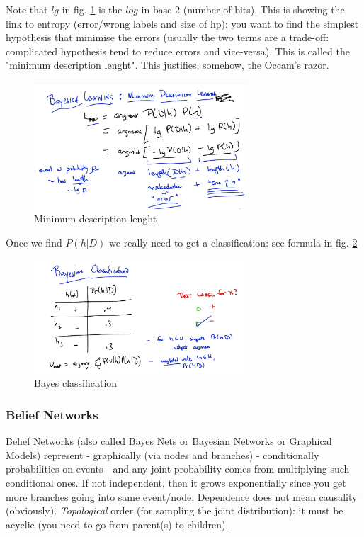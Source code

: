 \documentclass[11pt]{article}
\begin{document}
Note that $lg$ in fig. \ref{bayesian_learning3} is the $log$ in base $2$ (number of bits). This is showing the link to entropy (error/wrong labels and size of hp): you want to find the simplest hypothesis that minimise the errors (usually the two terms are a trade-off: complicated hypothesis tend to reduce errors and vice-versa). This is called the "minimum description lenght". This justifies, somehow, the Occam's razor.
\begin{figure}[htbp] 
	\centering
	\includegraphics[width=0.7\textwidth]{pics/bayesian_learning_3}
	\caption{Minimum description lenght} 
	\label{bayesian_learning3}
\end{figure}

Once we find $P(h|D)$ we really need to get a classification: see formula in fig. \ref{bayesian_learning4} 
\begin{figure}[htbp] 
	\centering
	\includegraphics[width=0.7\textwidth]{pics/bayesian_learning_4}
	\caption{Bayes classification} 
	\label{bayesian_learning4}
\end{figure}

\subsubsection{Belief Networks}
Belief Networks (also called Bayes Nets or Bayesian Networks or Graphical Models) represent - graphically (via nodes and branches) - conditionally probabilities on events - and any joint probability comes from multiplying such conditional ones. If not independent, then it grows exponentially since you get more branches going into same event/node. Dependence does not mean causality (obviously). \textit{Topological} order (for sampling the joint distribution): it must be acyclic (you need to go from parent(s) to children).
\end{document}
